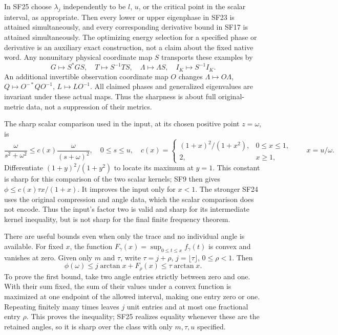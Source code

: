 \documentclass[10pt]{article}
\begin{document}
In SF25 choose \(\lambda_j\) independently to be \(l\), \(u\), or the critical point in the scalar interval, as appropriate. Then every lower or upper eigenphase in SF23 is attained simultaneously, and every corresponding derivative bound in SF17 is attained simultaneously. The optimizing energy selection for a specified phase or derivative is an auxiliary exact construction, not a claim about the fixed native word. Any nonunitary physical coordinate map \(S\) transports these examples by \[
 G\mapsto S^*GS,\quad T\mapsto S^{-1}TS,\quad
 \Lambda\mapsto\Lambda S,\quad I_K\mapsto S^{-1}I_K.
 \tag{SF27}
\] An additional invertible observation coordinate map \(O\) changes \(\Lambda\mapsto O\Lambda\), \(Q\mapsto O^{-*}QO^{-1}\), \(L\mapsto LO^{-1}\). All claimed phases and generalized eigenvalues are invariant under these actual maps. Thus the sharpness is about full original-metric data, not a suppression of their metrics.

The sharp scalar comparison used in the input, at its chosen positive point \(z=\omega\), is \[
 \frac{\omega}{s^2+\omega^2}
 \le c(x)\frac{\omega}{(s+\omega)^2},\quad 0\le s\le u,\quad
 c(x)=
 \begin{cases}(1+x)^2/(1+x^2),&0\le x\le1,\\2,&x\ge1,\end{cases}
 \qquad x=u/\omega.
 \tag{SF28}
\] Differentiate \((1+y)^2/(1+y^2)\) to locate its maximum at \(y=1\). This constant is sharp for this comparison of the two scalar kernels; SF9 then gives \(\phi\le c(x)\tau x/(1+x)\). It improves the input only for \(x<1\). The stronger SF24 uses the original compression and angle data, which the scalar comparison does not encode. Thus the input's factor two is valid and sharp for its intermediate kernel inequality, but is not sharp for the final finite frequency theorem.

There are useful bounds even when only the trace and no individual angle is available. For fixed \(x\), the function \(F_\gamma(x)=\sup_{0\le t\le x}f_\gamma(t)\) is convex and vanishes at zero. Given only \(m\) and \(\tau\), write \(\tau=j+\rho\), \(j=\lfloor\tau\rfloor\), \(0\le\rho<1\). Then \[
 \phi(\omega)\le j\arctan x+F_\rho(x)\le\tau\arctan x.
 \tag{SF29}
\] To prove the first bound, take two angle entries strictly between zero and one. With their sum fixed, the sum of their values under a convex function is maximized at one endpoint of the allowed interval, making one entry zero or one. Repeating finitely many times leaves \(j\) unit entries and at most one fractional entry \(\rho\). This proves the inequality; SF25 realizes equality whenever these are the retained angles, so it is sharp over the class with only \(m,\tau,u\) specified.
\end{document}
